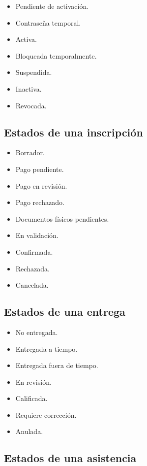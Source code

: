 \documentclass[12pt,a4paper]{article}
\begin{document}
\begin{itemize}[leftmargin=*]
\item Pendiente de activación.
\item Contraseña temporal.
\item Activa.
\item Bloqueada temporalmente.
\item Suspendida.
\item Inactiva.
\item Revocada.
\end{itemize}

\subsection{Estados de una inscripción}

\begin{itemize}[leftmargin=*]
\item Borrador.
\item Pago pendiente.
\item Pago en revisión.
\item Pago rechazado.
\item Documentos físicos pendientes.
\item En validación.
\item Confirmada.
\item Rechazada.
\item Cancelada.
\end{itemize}

\subsection{Estados de una entrega}

\begin{itemize}[leftmargin=*]
\item No entregada.
\item Entregada a tiempo.
\item Entregada fuera de tiempo.
\item En revisión.
\item Calificada.
\item Requiere corrección.
\item Anulada.
\end{itemize}

\subsection{Estados de una asistencia}
\end{document}
